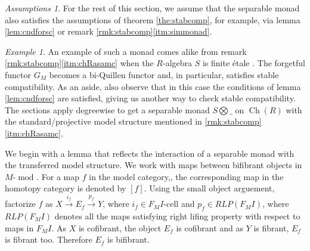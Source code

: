 \documentclass{article}
\newcommand{\module}[2][]{#2\text{-}\modop_{#1}}
\DeclareMathOperator{\Ch}{Ch}
\DeclareMathOperator{\modop}{mod}
\theoremstyle{definition}
\theoremstyle{remark}
\newtheorem{example}[theorem]{Example}
\newtheorem{assumption}[theorem]{Assumptions}
\begin{document}
\begin{assumption} \label{asm:sepassmpt}
For the rest of this section, we assume that the separable  monad also satisfies the assumptions of theorem \ref{the:stabcomp},
for example, via lemma \ref{lem:cndforsc} or remark \ref{rmk:stabcomp}\eqref{itm:simmonad}.
\end{assumption}

\begin{example} \label{exa:sepalgeb}
    An example of such a monad comes alike from remark 
    \ref{rmk:stabcomp}\eqref{itm:chRasamc} when the $R$-algebra $S$ is finite \'etale . The forgetful functor $G_{M}$ becomes a 
    bi-Quillen functor and, in particular, satisfies stable compatibility. As an aside, also observe that in this
    case the conditions of lemma \ref{lem:cndforsc} are satisfied, giving us another way to check stable compatibility.
    The sections apply degreewise to get a 
    separable monad $S \bigotimes \_$ on $\Ch(R)$ with the standard/projective model structure mentioned in 
    \ref{rmk:stabcomp}\eqref{itm:chRasamc}.
\end{example}

We begin with a lemma that reflects the interaction of a separable monad with the transferred model structure.
We work with maps between bifibrant objects in $\module{M}$. For a map $f$ in the model category,, the corresponding map in the homotopy category
is denoted by $[f]$.  Using the small object arguement, factorize $f$ as $X \xrightarrow{i_{f}} E_{f} \xrightarrow{p_{f}}Y$, where $i_{f} \in F_{M}I\text{-cell}$ and $p_{f} \in RLP(F_{M}I)$, where $RLP(F_M I)$ denotes all the maps satisfying right lifing property with respect to maps in $F_M I$. 
As $X$ is cofibrant, the object $E_{f}$ is cofibrant  and as $Y$ is fibrant, $E_{f}$ is fibrant too. Therefore $E_{f}$ is bifibrant.
\end{document}
